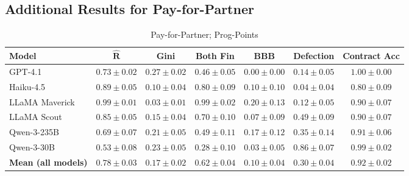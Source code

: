 \documentclass{article} %
\newcommand{\PPC}{Prog-Points\xspace}
\newcommand{\GPT}{GPT-4.1\xspace}
\newcommand{\Haiku}{Haiku-4.5\xspace}
\newcommand{\Maverick}{LLaMA Maverick\xspace}
\newcommand{\Scout}{LLaMA Scout\xspace}
\newcommand{\Qttf}{Qwen-3-235B\xspace}
\newcommand{\Qthirty}{Qwen-3-30B\xspace}
\newcommand{\PforP}{Pay-for-Partner\xspace}
\begin{document}
\subsection{Additional Results for \PforP}
\label{sec:additional_results_p4p}
\begin{table}[t]
\centering
\begin{small}
\begin{tabular}{lcccccc}
\toprule
\textbf{Model}
& \textbf{$\mathbf{\hat{R}}$}
& \textbf{Gini}
& \textbf{Both Fin}
& \textbf{BBB}
& \textbf{Defection}
& \textbf{Contract Acc}
\\
\midrule
%
\GPT
& $0.73 \pm 0.02$
& $0.27 \pm 0.02$
& $0.46 \pm 0.05$
& $0.00 \pm 0.00$
& $0.14 \pm 0.05$
& $1.00 \pm 0.00$
\\

\Haiku
& $0.89 \pm 0.05$
& $0.10 \pm 0.04$
& $0.80 \pm 0.09$
& $0.10 \pm 0.10$
& $0.04 \pm 0.04$
& $0.80 \pm 0.09$
\\

\Maverick
& $0.99 \pm 0.01$
& $0.03 \pm 0.01$
& $0.99 \pm 0.02$
& $0.20 \pm 0.13$
& $0.12 \pm 0.05$
& $0.90 \pm 0.07$
\\

\Scout
& $0.85 \pm 0.05$
& $0.15 \pm 0.04$
& $0.70 \pm 0.10$
& $0.07 \pm 0.09$
& $0.49 \pm 0.09$
& $0.90 \pm 0.07$
\\

\Qttf
& $0.69 \pm 0.07$
& $0.21 \pm 0.05$
& $0.49 \pm 0.11$
& $0.17 \pm 0.12$
& $0.35 \pm 0.14$
& $0.91 \pm 0.06$
\\

\Qthirty
& $0.53 \pm 0.08$
& $0.23 \pm 0.05$
& $0.28 \pm 0.10$
& $0.03 \pm 0.05$
& $0.86 \pm 0.07$
& $0.99 \pm 0.02$
\\

\midrule
%
\textbf{Mean (all models)}
& $\mathbf{0.78 \pm 0.03}$
& $\mathbf{0.17 \pm 0.02}$
& $\mathbf{0.62 \pm 0.04}$
& $\mathbf{0.10 \pm 0.04}$
& $\mathbf{0.30 \pm 0.04}$
& $\mathbf{0.92 \pm 0.02}$
\\
\bottomrule
\end{tabular}
\end{small}
\caption{\PforP; \PPC}
\label{tab:}
\end{table}
\end{document}
